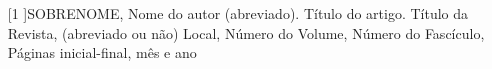 \section*{}
\begin{enumerate}
	\item[[1]]\small{SOBRENOME, Nome do autor (abreviado). Título do artigo. Título da Revista, (abreviado ou não) Local, Número do Volume, Número do Fascículo, Páginas inicial-final, mês e ano}
 \end{enumerate}


